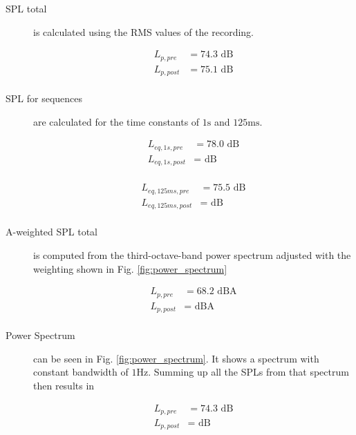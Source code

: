 \documentclass[twocolumn]{article}
\begin{document}
\begin{description}
\item[SPL total] is calculated using the RMS values of the recording.

\begin{equation}
\begin{align}
    L_{p,pre} & = 74.3 \textrm{ dB} \\
    L_{p,post} & = 75.1 \textrm{ dB} \\
\end{align}
\end{equation}

\item[SPL for sequences] are calculated for the time constants of $1\textrm{s}$ and $125\textrm{ms}$.

\begin{equation}
\begin{align}
    L_{eq,1s,pre} & = 78.0 \textrm{ dB} \\
    L_{eq,1s,post} & = \textrm{ dB} \\
\end{align}
\end{equation}

\begin{equation}
\begin{align}
    L_{eq,125ms,pre} & = 75.5 \textrm{ dB} \\
    L_{eq,125ms,post} & = \textrm{ dB} \\
\end{align}
\end{equation}

\item[A-weighted SPL total] is computed from the third-octave-band power spectrum adjusted with the weighting
    shown in Fig. \ref{fig:power_spectrum}

\begin{equation}
\begin{align}
    L_{p,pre} & = 68.2 \textrm{ dBA} \\
    L_{p,post} & = \textrm{ dBA} \\
\end{align}
\end{equation}

\item[Power Spectrum] can be seen in Fig. \ref{fig:power_spectrum}.
    It shows a spectrum with constant bandwidth of $1\textrm{Hz}$.
    Summing up all the SPLs from that spectrum then results in

\begin{equation}
\begin{align}
    L_{p,pre} & = 74.3 \textrm{ dB} \\
    L_{p,post} & = \textrm{ dB} \\
\end{align}
\end{equation}


\end{description}
\end{document}
